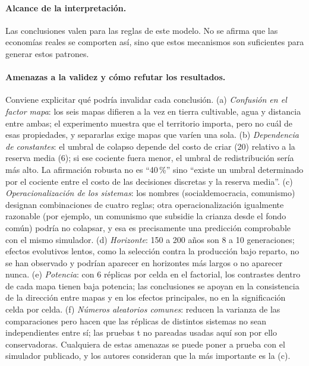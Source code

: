 \documentclass[11pt,a4paper]{article}
\begin{document}
\paragraph{Alcance de la interpretación.} Las conclusiones valen para las reglas de este modelo. No se afirma que las economías reales se comporten así, sino que estos mecanismos son suficientes para generar estos patrones.

\paragraph{Amenazas a la validez y cómo refutar los resultados.} Conviene explicitar qué podría invalidar cada conclusión. (a) \emph{Confusión en el factor mapa}: los seis mapas difieren a la vez en tierra cultivable, agua y distancia entre ambas; el experimento muestra que el territorio importa, pero no cuál de esas propiedades, y separarlas exige mapas que varíen una sola. (b) \emph{Dependencia de constantes}: el umbral de colapso depende del costo de criar (20) relativo a la reserva media (6); si ese cociente fuera menor, el umbral de redistribución sería más alto. La afirmación robusta no es ``40\,\%'' sino ``existe un umbral determinado por el cociente entre el costo de las decisiones discretas y la reserva media''. (c) \emph{Operacionalización de los sistemas}: los nombres (socialdemocracia, comunismo) designan combinaciones de cuatro reglas; otra operacionalización igualmente razonable (por ejemplo, un comunismo que subsidie la crianza desde el fondo común) podría no colapsar, y esa es precisamente una predicción comprobable con el mismo simulador. (d) \emph{Horizonte}: 150 a 200 años son 8 a 10 generaciones; efectos evolutivos lentos, como la selección contra la producción bajo reparto, no se han observado y podrían aparecer en horizontes más largos o no aparecer nunca. (e) \emph{Potencia}: con 6 réplicas por celda en el factorial, los contrastes dentro de cada mapa tienen baja potencia; las conclusiones se apoyan en la consistencia de la dirección entre mapas y en los efectos principales, no en la significación celda por celda. (f) \emph{Números aleatorios comunes}: reducen la varianza de las comparaciones pero hacen que las réplicas de distintos sistemas no sean independientes entre sí; las pruebas t no pareadas usadas aquí son por ello conservadoras. Cualquiera de estas amenazas se puede poner a prueba con el simulador publicado, y los autores consideran que la más importante es la (c).
\end{document}

